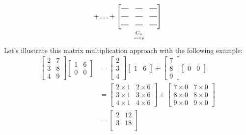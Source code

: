 \documentclass[../main.tex]{subfiles}
\begin{document}
{\[{    +
    \ldots
    +
    \underbracket[0pt][0pt]{
        \begin{bmatrix}
            \horzbar & \horzbar & \horzbar \\
            \horzbar & \horzbar & \horzbar \\
            \horzbar & \horzbar & \horzbar
        \end{bmatrix}
    }_{\mathstrut \underset{m \times p}{C_n}}}
\]
Let's illustrate this matrix multiplication approach with the following example:
\begin{align*}
    \begin{bmatrix}
        2 & 7 \\
        3 & 8 \\
        4 & 9
    \end{bmatrix}
    \begin{bmatrix}
        1 & 6 \\
        0 & 0
    \end{bmatrix}
     & =
    \begin{bmatrix}
        2 \\
        3 \\
        4
    \end{bmatrix}
    \begin{bmatrix}
        1 & 6
    \end{bmatrix}
    +
    \begin{bmatrix}
        7 \\
        8 \\
        9
    \end{bmatrix}
    \begin{bmatrix}
        0 & 0
    \end{bmatrix} \\
     & =
    \begin{bmatrix}
        2 \times 1 & 2 \times 6 \\
        3 \times 1 & 3 \times 6 \\
        4 \times 1 & 4 \times 6
    \end{bmatrix}
    +
    \begin{bmatrix}
        7 \times 0 & 7 \times 0 \\
        8 \times 0 & 8 \times 0 \\
        9 \times 0 & 9 \times 0
    \end{bmatrix} \\
     & =
    \begin{bmatrix}
        2 & 12 \\
        3 & 18 \\

\end{bmatrix}
\end{align*}}
\end{document}
